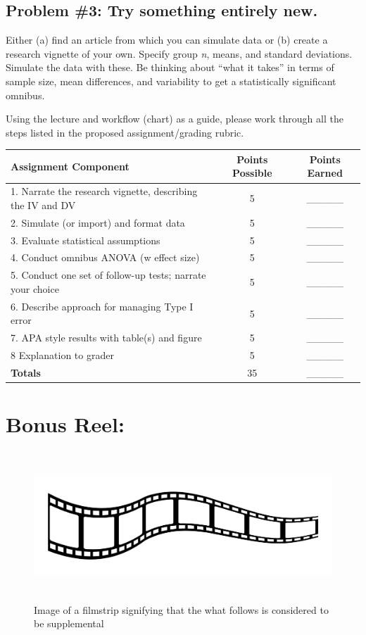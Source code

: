 \documentclass[
  english,
]{book}
\begin{document}
\hypertarget{problem-3-try-something-entirely-new.}{%
\subsection{Problem \#3: Try something entirely new.}\label{problem-3-try-something-entirely-new.}}

Either (a) find an article from which you can simulate data or (b) create a research vignette of your own. Specify group \emph{n}, means, and standard deviations. Simulate the data with these. Be thinking about ``what it takes'' in terms of sample size, mean differences, and variability to get a statistically significant omnibus.

Using the lecture and workflow (chart) as a guide, please work through all the steps listed in the proposed assignment/grading rubric.

\begin{longtable}[]{@{}lcc@{}}
\toprule
Assignment Component & Points Possible & Points Earned \\
\midrule
\endhead
1. Narrate the research vignette, describing the IV and DV & 5 & \_\_\_\_\_ \\
2. Simulate (or import) and format data & 5 & \_\_\_\_\_ \\
3. Evaluate statistical assumptions & 5 & \_\_\_\_\_ \\
4. Conduct omnibus ANOVA (w effect size) & 5 & \_\_\_\_\_ \\
5. Conduct one set of follow-up tests; narrate your choice & 5 & \_\_\_\_\_ \\
6. Describe approach for managing Type I error & 5 & \_\_\_\_\_ \\
7. APA style results with table(s) and figure & 5 & \_\_\_\_\_ \\
8 Explanation to grader & 5 & \_\_\_\_\_ \\
\textbf{Totals} & 35 & \_\_\_\_\_ \\
\bottomrule
\end{longtable}

\hypertarget{bonus-reel}{%
\section{Bonus Reel:}\label{bonus-reel}}

\begin{figure}
\hypertarget{id}{%
\centering
\includegraphics[width=6.45833in,height=2.19792in]{images/film-strip-1.jpg}
\caption{Image of a filmstrip signifying that the what follows is considered to be supplemental}\label{id}
}
\end{figure}
\end{document}
